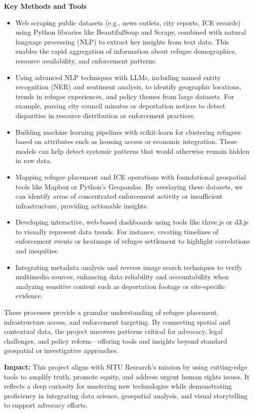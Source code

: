 \documentclass[letterpaper,10pt]{article}
\newcommand{\resumeItem}[1]{
	\item\small{
		{#1 \vspace{-2pt}}
	}
}
\newcommand{\resumeItemListStart}{\begin{itemize}}
\newcommand{\resumeItemListEnd}{\end{itemize}\vspace{-5pt}}
\newcommand{\resumeParagraph}[1]{
	\item[]
	\parbox{\linewidth}{
		\small{#1\xspace} %
	}
	\vspace{-7pt}
}
\begin{document}
\resumeParagraph{\textbf{Key Methods and Tools}}
\vspace{-8pt}
\resumeItemListStart
\resumeItem{Web scraping public datasets (e.g., news outlets, city reports, ICE records) using Python libraries like BeautifulSoup and Scrapy, combined with natural language processing (NLP) to extract key insights from text data. This enables the rapid aggregation of information about refugee demographics, resource availability, and enforcement patterns.}
\resumeItem{Using advanced NLP techniques with LLMs, including named entity recognition (NER) and sentiment analysis, to identify geographic locations, trends in refugee experiences, and policy themes from large datasets. For example, parsing city council minutes or deportation notices to detect disparities in resource distribution or enforcement practices.}
\resumeItem{Building machine learning pipelines with scikit-learn for clustering refugees based on attributes such as housing access or economic integration. These models can help detect systemic patterns that would otherwise remain hidden in raw data.}
\resumeItem{Mapping refugee placement and ICE operations with foundational geospatial tools like Mapbox or Python’s Geopandas. By overlaying these datasets, we can identify areas of concentrated enforcement activity or insufficient infrastructure, providing actionable insights.}
\resumeItem{Developing interactive, web-based dashboards using tools like three.js or d3.js to visually represent data trends. For instance, creating timelines of enforcement events or heatmaps of refugee settlement to highlight correlations and inequities.}
\resumeItem{Integrating metadata analysis and reverse image search techniques to verify multimedia sources, enhancing data reliability and accountability when analyzing sensitive content such as deportation footage or site-specific evidence.}
\resumeItemListEnd

\resumeParagraph{These processes provide a granular understanding of refugee placement, infrastructure access, and enforcement targeting. By connecting spatial and contextual data, the project uncovers patterns critical for advocacy, legal challenges, and policy reform—offering tools and insights beyond standard geospatial or investigative approaches.}



\vspace{4pt}

\resumeParagraph{\textbf{Impact:} This project aligns with SITU Research’s mission by using cutting-edge tools to amplify truth, promote equity, and address urgent human rights issues. It reflects a deep curiosity for mastering new technologies while demonstrating proficiency in integrating data science, geospatial analysis, and visual storytelling to support advocacy efforts.}
\end{document}
